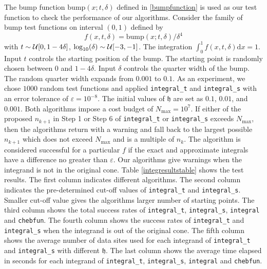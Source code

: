 \documentclass{iitthesis}
\DeclareMathOperator{\Var}{Var}
\theoremstyle{definition}
\theoremstyle{remark}
\begin{document}
The bump function $\text{bump}(x;t,\delta)$ defined in \eqref{bumpfunction} is used as our test function to check the performance of our algorithms. Consider the family of bump test functions on interval $(0,1)$ defined by
\begin{equation}\label{testfun}
f(x,t,\delta)= \text{bump}(x;t,\delta)/\delta^{4}
\end{equation}
with  $t \sim \mathcal{U}[0,1-4\delta]$, $\log_{10}(\delta) \sim \mathcal{U}[-3,-1]$. The integration $\int_{0}^{1}f(x,t,\delta)\text{d}x=1$. Input $t$ controls the starting position of the bump. The starting point is randomly chosen between $0$ and $1-4\delta$. Input $\delta$ controls the quarter width of the bump. The random quarter width expands from $0.001$ to $0.1$.
As an experiment, we chose $1000$ random test functions and applied {\tt integral\_t} and {\tt integral\_s} with an error tolerance of  $\varepsilon = 10^{-8}$. The initial values of $\mathfrak{h}$ are set as $0.1$, $0.01$, and $0.001$. Both algorithms impose a cost budget of $N_{\max}=10^7$. If either of the proposed $n_{k+1}$ in Step 1 or Step 6 of {\tt integral\_t} or {\tt integral\_s} exceeds $N_{\max}$, then the algorithms return with a warning and fall back to the largest possible $n_{k+1}$ which does not exceed $N_{\max}$ and is a multiple of $n_{k}$.  The algorithm is considered successful for a particular $f$ if the exact and approximate integrals have a difference no greater than $\varepsilon$. Our algorithms give warnings when the integrand is not in the original cone. Table \ref{integresultstable} shows the test results. The first column indicates different algorithms. The second column indicates the pre-determined cut-off values of {\tt integral\_t} and {\tt integral\_s}. Smaller cut-off value gives the algorithms larger number of starting points. The third column shows the total success rates of {\tt integral\_t}, {\tt integral\_s}, {\tt integral} and {\tt chebfun}. The fourth column shows the success rates of {\tt integral\_t} and {\tt integral\_s} when the integrand is out of the original cone. The fifth column shows the average number of data sites used for each integrand of {\tt integral\_t} and {\tt integral\_s} with different $\mathfrak{h}$. The last column shows the average time elapsed in seconds for each integrand of {\tt integral\_t}, {\tt integral\_s}, {\tt integral} and {\tt chebfun}.  %
\end{document}
